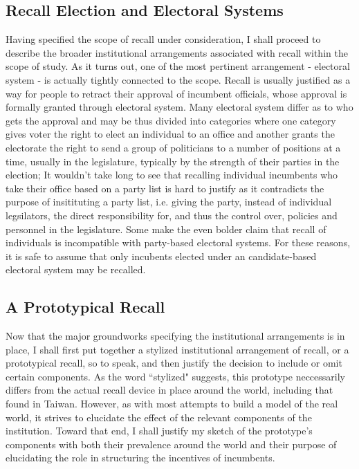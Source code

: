 \documentclass[hyphens, crop=false]{standalone}
\begin{document}
		\subsection*{Recall Election and Electoral Systems} 
		Having specified the scope of recall under consideration,
		I shall proceed to describe the broader institutional arrangements associated with recall within the scope of study.
		As it turns out,
		one of
		the most pertinent arrangement
		- electoral system -
		is actually tightly connected to the scope.
		Recall is usually justified as a way for people to retract their approval of incumbent officials,
		whose approval is formally granted through electoral system.
		Many electoral system differ as to who gets the approval
		and
		may be thus divided into categories where
		one category gives voter the right to elect an individual to an office
		and
		another grants the electorate the right to send a group of politicians to
		a number of positions at a time, usually in the legislature,
		typically by the strength of their parties in the election;
		It wouldn't take long to see that recalling individual incumbents who take their office based on a party list is hard to justify
		as it contradicts the purpose of insitituting a party list, i.e. giving the party,
		instead of individual legsilators,
		the direct responsibility for, and thus the control over, policies and personnel in the legislature.
		Some make the even bolder claim that recall of individuals is incompatible with party-based electoral systems.
		For these reasons, it is safe to assume that only incubents elected under an candidate-based electoral system may be recalled.
		
		\subsection*{A Prototypical Recall}
		Now that the major groundworks specifying the institutional arrangements is in place,
		I shall first put together a stylized institutional arrangement of recall,
		or a prototypical recall, so to speak,
		and then justify the decision to include or omit certain components.
		As the word ``stylized" suggests, this prototype neccessarily differs from the actual recall device in place around the world,
		including that found in Taiwan.
		However, as with most attempts to build a model of the real world,
		it strives to elucidate the effect of the relevant components of the institution.
		Toward that end, I shall justify my sketch of the prototype's components
		with both their prevalence around the world  
		and their purpose of elucidating the role in structuring the incentives of incumbents.
		
\end{document}
